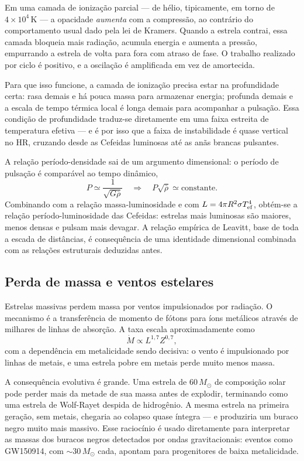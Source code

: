 \documentclass[11pt,a4paper]{article}
\begin{document}
Em uma camada de ionização parcial --- de hélio, tipicamente, em torno de $4\times10^{4}\,\mathrm{K}$ --- a opacidade \emph{aumenta} com a compressão, ao contrário do comportamento usual dado pela lei de Kramers. Quando a estrela contrai, essa camada bloqueia mais radiação, acumula energia e aumenta a pressão, empurrando a estrela de volta para fora com atraso de fase. O trabalho realizado por ciclo é positivo, e a oscilação é amplificada em vez de amortecida.

Para que isso funcione, a camada de ionização precisa estar na profundidade certa: rasa demais e há pouca massa para armazenar energia; profunda demais e a escala de tempo térmica local é longa demais para acompanhar a pulsação. Essa condição de profundidade traduz-se diretamente em uma faixa estreita de temperatura efetiva --- e é por isso que a faixa de instabilidade é quase vertical no HR, cruzando desde as Cefeidas luminosas até as anãs brancas pulsantes.

A relação período-densidade sai de um argumento dimensional: o período de pulsação é comparável ao tempo dinâmico,
\[
P\simeq\frac{1}{\sqrt{G\bar{\rho}}}
\quad\Longrightarrow\quad
P\sqrt{\bar{\rho}}\simeq\text{constante}.
\]
Combinando com a relação massa-luminosidade e com $L=4\pi R^{2}\sigma T_{\rm ef}^{4}$, obtém-se a relação período-luminosidade das Cefeidas: estrelas mais luminosas são maiores, menos densas e pulsam mais devagar. A relação empírica de Leavitt, base de toda a escada de distâncias, é consequência de uma identidade dimensional combinada com as relações estruturais deduzidas antes.

\subsection*{Perda de massa e ventos estelares}

Estrelas massivas perdem massa por ventos impulsionados por radiação. O mecanismo é a transferência de momento de fótons para íons metálicos através de milhares de linhas de absorção. A taxa escala aproximadamente como
\[
\dot{M}\propto L^{1{,}7}Z^{0{,}7},
\]
com a dependência em metalicidade sendo decisiva: o vento é impulsionado por linhas de metais, e uma estrela pobre em metais perde muito menos massa.

A consequência evolutiva é grande. Uma estrela de $60\,M_\odot$ de composição solar pode perder mais da metade de sua massa antes de explodir, terminando como uma estrela de Wolf-Rayet despida de hidrogênio. A mesma estrela na primeira geração, sem metais, chegaria ao colapso quase íntegra --- e produziria um buraco negro muito mais massivo. Esse raciocínio é usado diretamente para interpretar as massas dos buracos negros detectados por ondas gravitacionais: eventos como GW150914, com $\sim30\,M_\odot$ cada, apontam para progenitores de baixa metalicidade.
\end{document}
